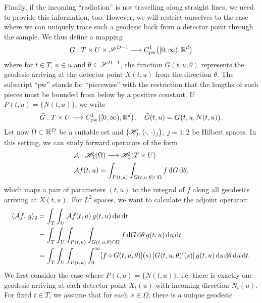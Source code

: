 \documentclass{amsart}
\begin{document}
%
%
Finally, if the incoming ``radiation'' is not travelling along straight lines, we need to provide this information, too. However, we will 
restrict ourselves to the case where we can uniquely trace such a geodesic back from a detector point through the sample. We thus define a 
mapping
%
\begin{equation}
 G: T \times U \times \mathscr{S}^{D-1} \longrightarrow C_{\mathrm{pw}}^1\big([0,\infty), {\mathbb{R}}^d\big)
\end{equation} 
%
where for $t \in T$, $u \in u$ and $\theta \in \mathscr{S}^{D-1}$, the function $G(t, u, \theta)$ represents the geodesic arriving at the 
detector point $X(t, u)$ from the direction $\theta$. The subscript ``pw'' stands for ``piecewise'' with the restriction that the lengths 
of such pieces must be bounded from below by a positive constant.  If $P(t,u) = \lbrace N(t,u)\rbrace$, we write 
%
\begin{equation}
 \tilde G: T \times U \longrightarrow C_{\mathrm{pw}}^1\big([0,\infty), {\mathbb{R}}^d\big),\quad \tilde G(t,u) = G\big(t, u, N(t,u)\big).
\end{equation}
%
%
Let now $\Omega \subset {\ensuremath{\mathbb{R}}}^D$ be a suitable set and $\big({\mathscr{H}}_j, \langle \cdot,\,\cdot\rangle_j\big)$, $j=1,2$ be Hilbert spaces. In this 
setting, we can study forward operators of the form
%
\begin{align}
 & {\mathcal{A}}: {\mathscr{H}}_1(\Omega) \longrightarrow {\ensuremath{\mathscr{H}}}_2(T \times U) \\
 & {\mathcal{A}} f(t, u) = \int_{P(t, u)} \int_{G(t, u, \theta) \cap \Omega} f \, \mathrm{d} G\, \mathrm{d} \theta.
\end{align}
%
which maps a pair of parameters $(t, u)$ to the integral of $f$ along all geodesics arriving at $X(t, u)$. For $L^2$ spaces, we want to 
calculate the adjoint operator:
%
\begin{align}
 \langle {\ensuremath{\mathcal{A}}} f,\,g\rangle_2 
 &= \int_T \int_U {\mathcal{A}} f(t, u)\, g(t, u)\, \mathrm{d} u\, \mathrm{d} t \notag \\
 &= \int_T \int_U \int_{P(t, u)} \int_{G(t, u, \theta) \cap \Omega} f \, \mathrm{d} G\, \mathrm{d} \theta\, g(t, u)\, \mathrm{d} u\, \mathrm{d} t \notag \\
 \label{eq:adj_calculation_step1}
 &= \int_T \int_U \int_{P(t, u)} \int_0^\infty  [f \circ G(t, u, \theta)](s)\, |G(t, u, \theta)'(s)|\, g(t, u)\, \mathrm{d} s\, 
 \mathrm{d} \theta\, \mathrm{d} u\, \mathrm{d} t.
\end{align}
%
We first consider the case where $P(t,u) = \lbrace N(t,u)\rbrace$, i.e. there is exactly one geodesic arriving at each detector point 
$X_t(u)$ with incoming direction $N_t(u)$. For fixed $t \in T$, we assume that for each $x \in \Omega$, there is a unique geodesic 
\end{document}
